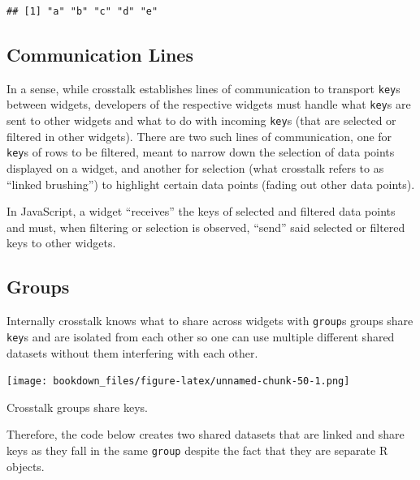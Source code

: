 \documentclass[
]{krantz}
\makeatletter
\newenvironment{Shaded}{\begin{snugshade}}{\end{snugshade}}
\newcommand{\DataTypeTok}[1]{\textcolor[rgb]{0.27,0.27,0.27}{#1}}
\newcommand{\KeywordTok}[1]{\textcolor[rgb]{0.27,0.27,0.27}{\textbf{#1}}}
\newcommand{\NormalTok}[1]{#1}
\newcommand{\OperatorTok}[1]{\textcolor[rgb]{0.43,0.43,0.43}{\textbf{#1}}}
\newcommand{\StringTok}[1]{\textcolor[rgb]{0.5,0.5,0.5}{#1}}
\newenvironment{kframe}{%
\medskip{}
\setlength{\fboxsep}{.8em}
 \def\at@end@of@kframe{}%
 \ifinner\ifhmode%
  \def\at@end@of@kframe{\end{minipage}}%
  \begin{minipage}{\columnwidth}%
 \fi\fi%
 \def\FrameCommand##1{\hskip\@totalleftmargin \hskip-\fboxsep
 \colorbox{shadecolor}{##1}\hskip-\fboxsep
     \hskip-\linewidth \hskip-\@totalleftmargin \hskip\columnwidth}%
 \MakeFramed {\advance\hsize-\width
   \@totalleftmargin\z@ \linewidth\hsize
   \@setminipage}}%
 {\par\unskip\endMakeFramed%
 \at@end@of@kframe}
\renewenvironment{Shaded}{\begin{kframe}}{\end{kframe}}
\newenvironment{rmdblock}[1]
  {
  \begin{itemize}
  \renewcommand{\labelitemi}{
    \raisebox{-.7\height}[0pt][0pt]{
      {\setkeys{Gin}{width=3em,keepaspectratio}\texttt{[image: images/\#1]}}
    }
  }
  \setlength{\fboxsep}{1em}
  \begin{kframe}
  \item
  }
  {
  \end{kframe}
  \end{itemize}
  }
\newenvironment{rmdnote}
  {\begin{rmdblock}{note}}
  {\end{rmdblock}}
\makeatother
\begin{document}
\begin{verbatim}
## [1] "a" "b" "c" "d" "e"
\end{verbatim}

\hypertarget{linking-widgets-communication-lines}{%
\subsection{Communication Lines}\label{linking-widgets-communication-lines}}

In a sense, while crosstalk establishes lines of communication to transport \texttt{key}s between widgets, developers of the respective widgets must handle what \texttt{key}s are sent to other widgets and what to do with incoming \texttt{key}s (that are selected or filtered in other widgets). There are two such lines of communication, one for \texttt{key}s of rows to be filtered, meant to narrow down the selection of data points displayed on a widget, and another for selection (what crosstalk refers to as ``linked brushing'') to highlight certain data points (fading out other data points).

In JavaScript, a widget ``receives'' the keys of selected and filtered data points and must, when filtering or selection is observed, ``send'' said selected or filtered keys to other widgets.

\hypertarget{linking-widgets-groups}{%
\subsection{Groups}\label{linking-widgets-groups}}

Internally crosstalk knows what to share across widgets with \texttt{group}s groups share \texttt{key}s and are isolated from each other so one can use multiple different shared datasets without them interfering with each other.

\texttt{[image: bookdown\_files/figure-latex/unnamed-chunk-50-1.png]}

\begin{rmdnote}
Crosstalk groups share keys.
\end{rmdnote}

Therefore, the code below creates two shared datasets that are linked and share keys as they fall in the same \texttt{group} despite the fact that they are separate R objects.

\begin{Shaded}
\end{Shaded}
\end{document}
